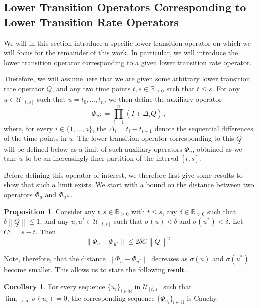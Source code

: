 \documentclass[10pt,a4paper]{paper}
\theoremstyle{definition}
\newtheorem{proposition}[theorem]{Proposition}
\newtheorem{corollary}[theorem]{Corollary}
\newcommand{\nats}{\mathbb{N}}
\newcommand{\reals}{\mathbb{R}}
\newcommand{\realspos}{\reals_{>0}}
\newcommand{\realsnonneg}{\reals_{\geq 0}}
\newcommand{\lrate}{\underline{Q}}
\newcommand{\norm}[1]{\left\lVert #1 \right\rVert}
\newcommand{\coloneqq}{:\!=}
\begin{document}
\subsection{Lower Transition Operators Corresponding to Lower Transition Rate Operators}

We will in this section introduce a specific lower transition operator on which we will focus for the remainder of this work. In particular, we will introduce the lower transition operator corresponding to a given lower transition rate operator.

Therefore, we will assume here that we are given some arbitrary lower transition rate operator $\lrate$, and any two time points $t,s\in\realsnonneg$ such that $t\leq s$. For any $u\in\mathcal{U}_{[t,s]}$ such that $u=t_0,\ldots,t_n$, we then define the auxiliary operator
\begin{equation}\label{eq:aux_lower_trans}
\Phi_u\coloneqq\prod_{i=1}^n(I+\Delta_i\lrate)\,,
\end{equation}
where, for every $i\in\{1,\ldots,n\}$, the $\Delta_i=t_i-t_{i-1}$ denote the sequential differences of the time points in $u$. The lower transition operator corresponding to this $\lrate$ will be defined below as a limit of such auxiliary operators $\Phi_u$, obtained as we take $u$ to be an increasingly finer partition of the interval $[t,s]$.

Before defining this operator of interest, we therefore first give some results to show that such a limit exists. We start with a bound on the distance between two operators $\Phi_u$ and $\Phi_{u*}$.

\begin{proposition}\label{prop:differencebetweenu}
Consider any $t,s\in\realsnonneg$ with $t\leq s$, any $\delta\in\realspos$ such that $\delta\norm{\lrate}\leq1$, and any $u,u^*\in\mathcal{U}_{[t,s]}$ such that $\sigma(u)<\delta$ and $\sigma(u^*)<\delta$. Let $C\coloneqq s-t$. Then
\begin{equation*}
\norm{\Phi_u-\Phi_{u^*}}\leq 2\delta C\norm{\lrate}^2\,.
\end{equation*}
\end{proposition}

Note, therefore, that the distance $\norm{\Phi_u - \Phi_{u^*}}$ decreases as $\sigma(u)$ and $\sigma(u^*)$ become smaller. This allows us to state the following result.

\begin{corollary}\label{corol:cauchy}
For every sequence $\{u_i\}_{i\in\nats}$ in $\mathcal{U}_{[t,s]}$ such that $\lim_{i\to\infty}\sigma(u_i)=0$, the corresponding sequence $\{\Phi_{u_i}\}_{i\in\nats}$ is Cauchy.
\end{corollary}
\end{document}
